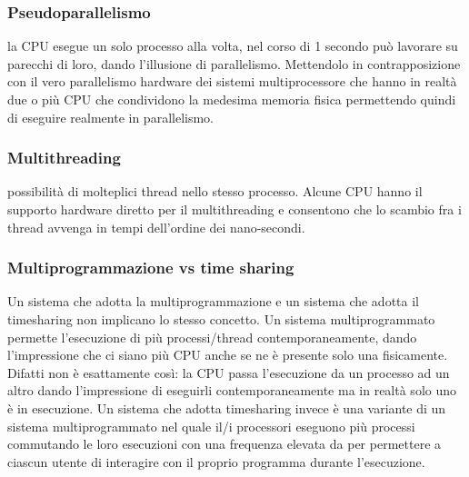 \documentclass{article}
\begin{document}
\subsubsection{Pseudoparallelismo}
la CPU esegue un solo processo alla volta, nel corso
di 1 secondo può lavorare su parecchi di loro, dando l’illusione di parallelismo. Mettendolo in contrapposizione con il vero parallelismo hardware
dei sistemi multiprocessore che hanno in realtà due o più CPU che condividono la medesima memoria fisica permettendo quindi di eseguire realmente in parallelismo.

\subsubsection{Multithreading}
possibilità di molteplici thread nello stesso processo.
Alcune CPU hanno il supporto hardware diretto per il multithreading e
consentono che lo scambio fra i thread avvenga in tempi dell’ordine dei
nano-secondi.

\subsubsection{Multiprogrammazione vs time sharing}
Un sistema che adotta la
multiprogrammazione e un sistema che adotta il timesharing non implicano lo stesso concetto. Un sistema multiprogrammato permette l’esecuzione
di più processi/thread contemporaneamente, dando l’impressione che ci
siano più CPU anche se ne è presente solo una fisicamente. Difatti non è
esattamente così: la CPU passa l’esecuzione da un processo ad un altro
dando l’impressione di eseguirli contemporaneamente ma in realtà solo
uno è in esecuzione. Un sistema che adotta timesharing invece è una variante di un sistema multiprogrammato nel quale il/i processori eseguono
più processi commutando le loro esecuzioni con una frequenza elevata da
per permettere a ciascun utente di interagire con il proprio programma
durante l’esecuzione.
\end{document}
